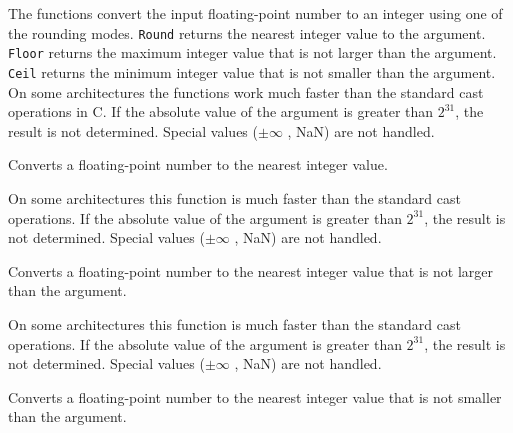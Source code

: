 \begin{description}
\end{description}


The functions convert the input floating-point number to an integer using one of the rounding
modes. \texttt{Round} returns the nearest integer value to the
argument. \texttt{Floor} returns the maximum integer value that is not
larger than the argument. \texttt{Ceil} returns the minimum integer
value that is not smaller than the argument. On some architectures the
functions work much faster than the standard cast
operations in C. If the absolute value of the argument is greater than
$2^{31}$, the result is not determined. Special values ($\pm \infty$ , NaN)
are not handled.

\else


Converts a floating-point number to the nearest integer value.


\begin{description}
\end{description}

On some architectures this function is much faster than the standard cast
operations. If the absolute value of the argument is greater than
$2^{31}$, the result is not determined. Special values ($\pm \infty$ , NaN)
are not handled.


Converts a floating-point number to the nearest integer value that is not larger than the argument.


\begin{description}
\end{description}

On some architectures this function is much faster than the standard cast
operations. If the absolute value of the argument is greater than
$2^{31}$, the result is not determined. Special values ($\pm \infty$ , NaN)
are not handled.


Converts a floating-point number to the nearest integer value that is not smaller than the argument.


\begin{description}
\end{description}

